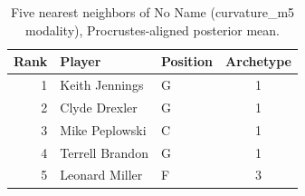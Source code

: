 \begin{table}[htbp]
  \centering\small
  \begin{tabular}{rllc}
    \toprule
    Rank & Player & Position & Archetype \\
    \midrule
    1 & Keith Jennings & G & 1 \\
    2 & Clyde Drexler & G & 1 \\
    3 & Mike Peplowski & C & 1 \\
    4 & Terrell Brandon & G & 1 \\
    5 & Leonard Miller & F & 3 \\
    \bottomrule
  \end{tabular}
  \caption{Five nearest neighbors of No Name (curvature_m5 modality), Procrustes-aligned posterior mean.}
  \label{tab:No_Name_neighbors_curvature_m5}
\end{table}

